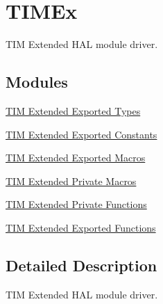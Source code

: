 \hypertarget{group___t_i_m_ex}{}\section{T\+I\+M\+Ex}
\label{group___t_i_m_ex}


T\+IM Extended H\+AL module driver.  


\subsection*{Modules}
\begin{DoxyCompactItemize}
\item 
\hyperlink{group___t_i_m_ex___exported___types}{T\+I\+M Extended Exported Types}
\item 
\hyperlink{group___t_i_m_ex___exported___constants}{T\+I\+M Extended Exported Constants}
\item 
\hyperlink{group___t_i_m_ex___exported___macros}{T\+I\+M Extended Exported Macros}
\item 
\hyperlink{group___t_i_m_ex___private___macros}{T\+I\+M Extended Private Macros}
\item 
\hyperlink{group___t_i_m_ex___private___functions}{T\+I\+M Extended Private Functions}
\item 
\hyperlink{group___t_i_m_ex___exported___functions}{T\+I\+M Extended Exported Functions}
\end{DoxyCompactItemize}


\subsection{Detailed Description}
T\+IM Extended H\+AL module driver. 

